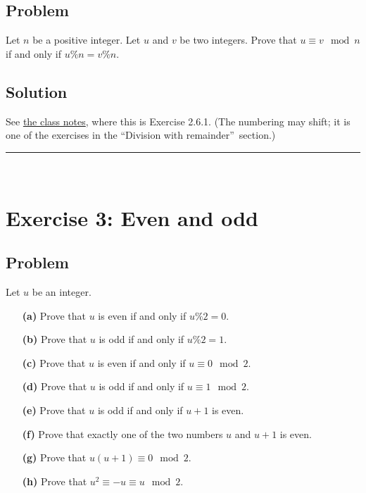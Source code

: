 \documentclass[paper=a4, fontsize=12pt]{scrartcl}%
\theoremstyle{plainsl}
\theoremstyle{definition}
\theoremstyle{remark}
\begin{document}
\subsection{Problem}

Let $n$ be a positive integer. Let $u$ and $v$ be two integers. Prove that
$u\equiv v\mod n$ if and only if $u\%n=v\%n$.

\subsection{Solution}

See \href{http://www-users.math.umn.edu/~dgrinber/19s/notes.pdf}{the class
notes}, where this is Exercise 2.6.1. (The numbering may shift; it is one of
the exercises in the \textquotedblleft Division with
remainder\textquotedblright\ section.)

\rule{\linewidth}{0.3pt} \\[0.4cm]

\section{Exercise 3: Even and odd}

\subsection{Problem}

Let $u$ be an integer.

\begin{enumerate}
\item[\textbf{(a)}] Prove that $u$ is even if and only if $u \% 2 = 0$.

\item[\textbf{(b)}] Prove that $u$ is odd if and only if $u \% 2 = 1$.

\item[\textbf{(c)}] Prove that $u$ is even if and only if $u \equiv0 \mod 2$.

\item[\textbf{(d)}] Prove that $u$ is odd if and only if $u \equiv1 \mod 2$.

\item[\textbf{(e)}] Prove that $u$ is odd if and only if $u + 1$ is even.

\item[\textbf{(f)}] Prove that exactly one of the two numbers $u$ and $u + 1$
is even.

\item[\textbf{(g)}] Prove that $u \left(  u+1 \right)  \equiv0 \mod 2$.

\item[\textbf{(h)}] Prove that $u^{2} \equiv-u \equiv u \mod 2$.
\end{enumerate}
\end{document}
